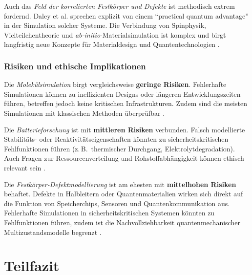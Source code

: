 \vspace{0.5em}

Auch das \textit{Feld der korrelierten Festkörper und Defekte} ist methodisch extrem fordernd. Daley et al. sprechen explizit von einem ``practical quantum advantage'' \cite{daley2022practical} in der Simulation solcher Systeme. Die Verbindung von Spinphysik, Vielteilchentheorie und \textit{ab-initio}-Materialsimulation ist komplex und birgt langfristig neue Konzepte für Materialdesign und Quantentechnologien \cite{bassett2019defect}.


\subsubsection{Risiken und ethische Implikationen}

Die \textit{Molekülsimulation} birgt vergleichsweise \textbf{geringe Risiken}. Fehlerhafte Simulationen können zu ineffizienten Designs oder längeren Entwicklungszeiten führen, betreffen jedoch keine kritischen Infrastrukturen. Zudem sind die meisten Simulationen mit klassischen Methoden überprüfbar \cite{mcardle2020quantum}.

\vspace{0.5em}

Die \textit{Batterieforschung} ist mit \textbf{mittleren Risiken} verbunden. Falsch modellierte Stabilitäts- oder Reaktivitätseigenschaften könnten zu sicherheitskritischen Fehlfunktionen führen (z.\,B.\ thermischer Durchgang, Elektrolytdegradation). Auch Fragen zur Ressourcenverteilung und Rohstoffabhängigkeit können ethisch relevant sein \cite{demir2024application}.

\vspace{0.5em}

Die \textit{Festkörper-Defektmodellierung} ist am ehesten mit \textbf{mittelhohen Risiken} behaftet. Defekte in Halbleitern oder Quantenmaterialien wirken sich direkt auf die Funktion von Speicherchips, Sensoren und Quantenkommunikation aus. Fehlerhafte Simulationen in sicherheitskritischen Systemen könnten zu Fehlfunktionen führen, zudem ist die Nachvollziehbarkeit quantenmechanischer Multizustandsmodelle begrenzt \cite{orus2019quantum,freysoldt2014first}.


\section{Teilfazit}


\printbibliography
